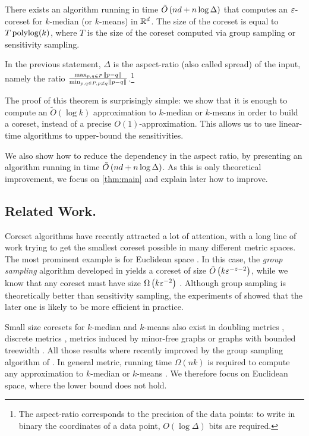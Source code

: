 \begin{theorem}\label{thm:main}
There exists an algorithm running in time $\tilde O\left( nd + n \log \Delta\right)$  that computes an $\varepsilon$-coreset for $k$-median (or $k$-means) in $\mathbb{R}^d$. The size of the coreset is equal to $T \operatorname{polylog}(k)$, where $T$ is the size of the coreset computed via group sampling or sensitivity sampling.
\end{theorem}
In the previous statement, $\Delta$ is the aspect-ratio (also called spread) of the input, namely the ratio $\frac{\max_{p, q \in P} \left\| p-q\right\|}{\min_{p, q \in P, p \neq q} \left\| p-q\right\|}$.\footnote{The aspect-ratio corresponds to the precision of the data points: to write in binary the coordinates of a data point, $O(\log \Delta)$ bits are required.}

The proof of this theorem is surprisingly simple: we show that it is enough to compute an $\tilde O(\log k)$ approximation to $k$-median or $k$-means in order
to build a coreset, instead of a precise $O(1)$-approximation. This allows us to use linear-time algorithms to upper-bound the sensitivities.

We also show how to reduce the dependency in the aspect ratio, by presenting an algorithm running in time $\tilde O\left( nd + n \log \Delta\right)$. As this is
only theoretical improvement, we focus on \cref{thm:main} and explain later how to improve.


\subsection{Related Work.}

Coreset algorithms have recently attracted a lot of attention, with a long line of work trying to get the smallest coreset possible in many different metric spaces. The most prominent example is for Euclidean space \cite{BadoiuHI02, HaM04, Chen09, HuangV20, stoc22}. 
In this case, the \textit{group sampling} algorithm developed in \cite{stoc21, stoc22} yields a coreset of size $\tilde O\left( k \varepsilon^{-z-2}\right)$, while we know that any coreset must have size $\Omega \left( k\varepsilon^{-2}\right)$ \cite{stoc22}.
Although group sampling is theoretically better than sensitivity sampling, the experiments of \cite{chrisESA} showed that the later one is likely to be more efficient in practice.

Small size coresets for $k$-median and $k$-means also exist in doubling metrics \cite{huang2018varepsilon}, discrete metrics \cite{FeldmanL11}, metrics induced by minor-free graphs \cite{BravermanJKW21} or graphs with bounded treewidth \cite{baker2020coresets}. 
All those results where recently improved by the group sampling algorithm of \cite{stoc21}. 
In general metric, running time $\Omega(nk)$ is required to compute any approximation to $k$-median or $k$-means \cite{mettu2004optimal}. 
We therefore focus on Euclidean space, where the lower bound does not hold.


